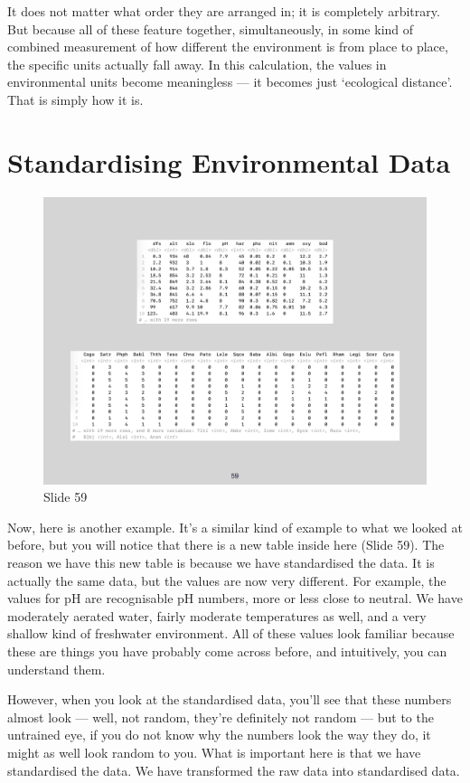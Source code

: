 \documentclass[
  11pt,
]{book}
\begin{document}
It does not matter what order they are arranged in; it is completely
arbitrary. But because all of these feature together, simultaneously, in
some kind of combined measurement of how different the environment is
from place to place, the specific units actually fall away. In this
calculation, the values in environmental units become meaningless --- it
becomes just `ecological distance'. That is simply how it is.

\section{Standardising Environmental
Data}\label{standardising-environmental-data}

\begin{figure}[ht]
\centering
\includegraphics[width=0.8\linewidth]{../images/BDC334/BDC334-059.jpeg}
\caption*{Slide 59}
\end{figure}

Now, here is another example. It's a similar kind of example to what we
looked at before, but you will notice that there is a new table inside
here (Slide 59). The reason we have this new table is because we have
standardised the data. It is actually the same data, but the values are
now very different. For example, the values for pH are recognisable pH
numbers, more or less close to neutral. We have moderately aerated
water, fairly moderate temperatures as well, and a very shallow kind of
freshwater environment. All of these values look familiar because these
are things you have probably come across before, and intuitively, you
can understand them.

However, when you look at the standardised data, you'll see that these
numbers almost look --- well, not random, they're definitely not random
--- but to the untrained eye, if you do not know why the numbers look
the way they do, it might as well look random to you. What is important
here is that we have standardised the data. We have transformed the raw
data into standardised data.
\end{document}
